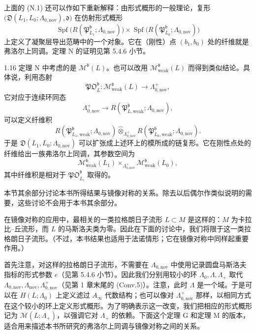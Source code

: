 上面的 (N.1) 还可以作如下重新解释：由形式概形的一般理论，复形
$\bigl(\mathfrak D(L_1,L_0;\Lambda_{0,\mathrm{nov}}),\mathfrak d\bigr)$
在仿射形式概形
\[
  \operatorname{Spf}\bigl(R(\mathfrak P^{\mathfrak b}_{L_1};\Lambda_{0,\mathrm{nov}})\bigr)
  \times
  \operatorname{Spf}\bigl(R(\mathfrak P^{\mathfrak b}_{L_0};\Lambda_{0,\mathrm{nov}})\bigr)
\]
上定义了凝聚层导出范畴中的一个对象。它在（刚性）点 $(b_1,b_0)$ 处的纤维就是弗洛尔上同调。定理 N 的证明见第 5.4.6 小节。

\begin{remark}{1.16}\label{rem:1-16}
定理 N 中考虑的是 $\mathcal M^{\mathfrak b}(L)$。也可以改用
$\mathcal M^{\mathfrak b}_{\mathrm{weak}}(L)$ 而得到类似结论。具体说，利用态射
\[
  \mathfrak{PO}^{\mathfrak b}_L:
  \mathcal M^{\mathfrak b}_{\mathrm{weak}}(L)
  \longrightarrow\Lambda^+_{0,\mathrm{nov}},
\]
它对应于连续环同态
\[
  \Lambda^+_{0,\mathrm{nov}}
  \longrightarrow
  R(\mathfrak P^{\mathfrak b}_{L,\mathrm{weak}};\Lambda_{0,\mathrm{nov}}),
\]
可以定义纤维积
\[
  R(\mathfrak P^{\mathfrak b}_{L_1,\mathrm{weak}};\Lambda_{0,\mathrm{nov}})
  \mathbin{\widehat\otimes}_{\Lambda^+_{0,\mathrm{nov}}}
  R(\mathfrak P^{\mathfrak b}_{L_0,\mathrm{weak}};\Lambda_{0,\mathrm{nov}}).
\]
于是 $\mathfrak D(L_1,L_0;\Lambda_{0,\mathrm{nov}})$ 可以扩张成上述环上的模所成的链复形。它在刚性点处的纤维给出一族弗洛尔上同调，其参数空间为
\[
  \mathcal M^{\mathfrak b}_{\mathrm{weak}}(L_1)
  \mathbin{\times}_{\Lambda^+_{0,\mathrm{nov}}}
  \mathcal M^{\mathfrak b}_{\mathrm{weak}}(L_0),
\]
其中纤维积是相对于 $\mathfrak{PO}^{\mathfrak b}_{L_i}$ 取得的。
\end{remark}

本节其余部分讨论本书所得结果与镜像对称的关系。除去以后偶尔作类似说明的需要，这些讨论不会用于本书其余部分。

在镜像对称的应用中，最相关的一类拉格朗日子流形 $L\subset M$ 是这样的：$M$ 为卡拉比--丘流形，而 $L$ 的马斯洛夫类为零。因此在下面的讨论中，我们将限于这一类拉格朗日子流形。（不过，本书结果也适用于法诺情形；它在镜像对称中同样起重要作用。）

首先注意，对这样的拉格朗日子流形，不需要在 $\Lambda_{0,\mathrm{nov}}$ 中使用记录圆盘马斯洛夫指标的形式参数 $e$（见第 5.4.6 小节）。因此我们分别用较小的环 $\Lambda_0,\Lambda,\Lambda_+$ 取代 $\Lambda_{0,\mathrm{nov}},\Lambda_{\mathrm{nov}},\Lambda^+_{0,\mathrm{nov}}$（见第 1 章末尾的 (Conv.5)）。注意，此时 $\Lambda$ 是一个域。于是可以在 $H(L;\Lambda_0)$ 上定义滤过 $A_\infty$ 代数结构；也可以像对 $\Lambda^+_{0,\mathrm{nov}}$ 那样，以相同方式在这个较小的环上定义形式概形。为了明确表示这一改变，我们把相应的形式概形记为 $\mathcal M(L;\Lambda_+)$，以强调它对 $\Lambda_+$ 的依赖。下面这个定理 G 和定理 M 的版本，适合用来描述本书所研究的弗洛尔上同调与镜像对称之间的关系。

